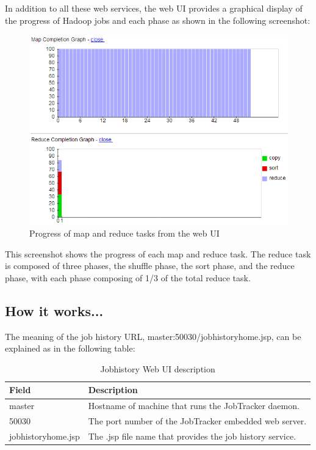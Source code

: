 In addition to all these web services, the web UI provides a graphical display of the progress of Hadoop jobs and each phase as shown in the following screenshot: \\
\begin{figure}[h]
  \centering
  \includegraphics[width=.8\textwidth]{figs/5163os_04_06.png}
  \caption{Progress of map and reduce tasks from the web UI}\label{fig:mapreduce.progress}
\end{figure} 

This screenshot shows the progress of each map and reduce task. The reduce task is composed of three phases, the shuffle phase, the sort phase, and the reduce phase, with each phase composing of 1/3 of the total reduce task.

\subsection*{How it works...}
The meaning of the job history URL, master:50030/jobhistoryhome.jsp, can be explained as in the following table:

\begin{table}
  \centering
  \begin{tabular}{ll}
    \toprule 
    \textbf{Field} & \textbf{Description} \\  \midrule
    master & Hostname of machine that runs the JobTracker daemon. \\
    50030 & The port number of the JobTracker embedded web server. \\
    jobhistoryhome.jsp & The .jsp file name that provides the job history service. \\ \bottomrule
  \end{tabular}
  \caption{Jobhistory Web UI description}\label{tbl:jobhistory}
\end{table}

